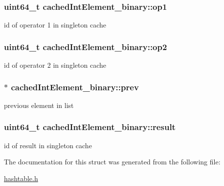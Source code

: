 \subsubsection[{\texorpdfstring{op1}{op1}}]{\setlength{\rightskip}{0pt plus 5cm}uint64\+\_\+t cached\+Int\+Element\+\_\+binary\+::op1}\hypertarget{structcachedIntElement__binary_aa4305da16240730699f33560c0f5aef0}{}\label{structcachedIntElement__binary_aa4305da16240730699f33560c0f5aef0}
id of operator 1 in singleton cache 
\subsubsection[{\texorpdfstring{op2}{op2}}]{\setlength{\rightskip}{0pt plus 5cm}uint64\+\_\+t cached\+Int\+Element\+\_\+binary\+::op2}\hypertarget{structcachedIntElement__binary_aff3a2ddce9bbb4e3e9c8621da7f23799}{}\label{structcachedIntElement__binary_aff3a2ddce9bbb4e3e9c8621da7f23799}
id of operator 2 in singleton cache 
\subsubsection[{\texorpdfstring{prev}{prev}}]{$\ast$ cached\+Int\+Element\+\_\+binary\+::prev}\hypertarget{structcachedIntElement__binary_ae0a95ff1f3a3062e706d06877014e8a6}{}\label{structcachedIntElement__binary_ae0a95ff1f3a3062e706d06877014e8a6}
previous element in list 
\subsubsection[{\texorpdfstring{result}{result}}]{\setlength{\rightskip}{0pt plus 5cm}uint64\+\_\+t cached\+Int\+Element\+\_\+binary\+::result}\hypertarget{structcachedIntElement__binary_a44ef9752977222f618137d8c1d6d4159}{}\label{structcachedIntElement__binary_a44ef9752977222f618137d8c1d6d4159}
id of result in singleton cache 

The documentation for this struct was generated from the following file\+:\begin{DoxyCompactItemize}
\item 
\hyperlink{hashtable_8h}{hashtable.\+h}\end{DoxyCompactItemize}
